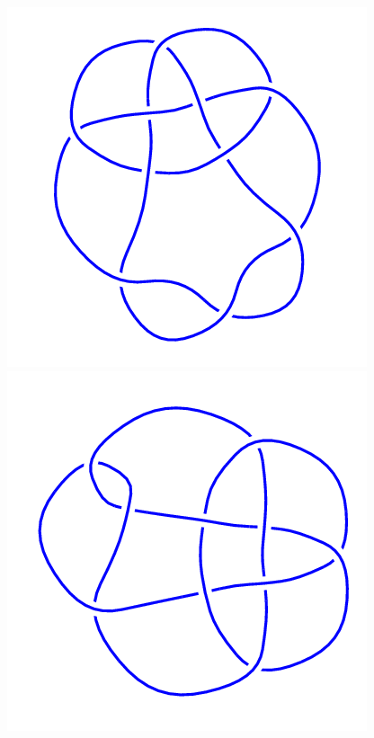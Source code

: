 \begin{figure}[H]
	\begin{minipage}[b]{.18\linewidth}
		\centering
		\includegraphics[width=\linewidth]{../data/10_112.png}
	\end{minipage}
	\begin{minipage}[b]{.18\linewidth}
		\centering
		\includegraphics[width=\linewidth]{../data/10_113.png}

\end{minipage}
\end{figure}
